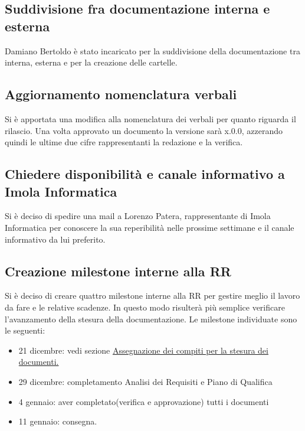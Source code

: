\subsection*{Suddivisione fra documentazione interna e esterna}
			Damiano Bertoldo è stato incaricato per la suddivisione della documentazione tra interna, esterna e per la creazione delle cartelle. 


\subsection*{Aggiornamento nomenclatura verbali}
      		Si è apportata una modifica alla nomenclatura dei verbali per quanto riguarda il rilascio.
      		Una volta approvato un documento la versione sarà x.0.0, azzerando quindi le ultime due cifre rappresentanti la redazione e la verifica.
      		


\subsection*{Chiedere disponibilità e canale informativo a Imola Informatica}
			Si è deciso di spedire una mail a Lorenzo Patera, rappresentante di Imola Informatica per conoscere la sua reperibilità nelle prossime settimane e il canale informativo da lui preferito.


\subsection*{Creazione milestone interne alla RR}
			Si è deciso di creare quattro milestone interne alla RR per gestire meglio il lavoro da fare e le relative scadenze.
			In questo modo risulterà più semplice verificare l'avanzamento della stesura della documentazione.
			Le milestone individuate sono le seguenti:
			\begin{itemize}
			\item 21 dicembre: vedi sezione \hyperlink{thesentence}{Assegnazione dei compiti per la stesura dei documenti.}
			\item 29 dicembre: completamento Analisi dei Requisiti e Piano di Qualifica
			\item 4 gennaio: aver completato(verifica e approvazione) tutti i documenti
			\item 11 gennaio: consegna.
			\end{itemize}





